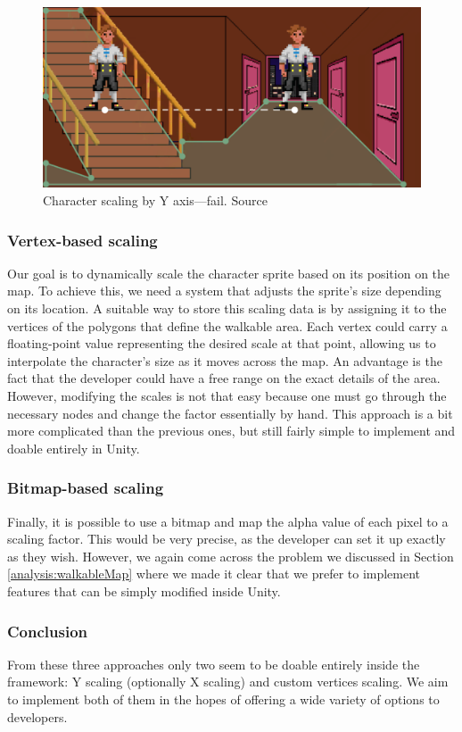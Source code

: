 \begin{figure}[H]
\centering
\includegraphics[width=.7\linewidth]{img/scalef-y.png}
\caption{Character scaling by Y axis—fail. Source \cite{Uurloon3}}
\label{fig:ScaleF}
\end{figure}

\subsubsection{Vertex-based scaling}
Our goal is to dynamically scale the character sprite based on its position on the map. To achieve this, we need a system that adjusts the sprite’s size depending on its location. A suitable way to store this scaling data is by assigning it to the vertices of the polygons that define the walkable area. Each vertex could carry a floating-point value representing the desired scale at that point, allowing us to interpolate the character's size as it moves across the map.  An advantage is the fact that the developer could have a free range on the exact details of the area. However, modifying the scales is not that easy because one must go through the necessary nodes and change the factor essentially by hand. This approach is a bit more complicated than the previous ones, but still fairly simple to implement and doable entirely in Unity.

\subsubsection{Bitmap-based scaling}
Finally, it is possible to use a bitmap and map the alpha value of each pixel to a scaling factor. This would be very precise, as the developer can set it up exactly as they wish. However, we again come across the problem we discussed in Section \ref{analysis:walkableMap} where we made it clear that we prefer to implement features that can be simply modified inside Unity.

\subsubsection{Conclusion}
From these three approaches only two seem to be doable entirely inside the framework: Y scaling (optionally X scaling) and custom vertices scaling. We aim to implement both of them in the hopes of offering a wide variety of options to developers.

